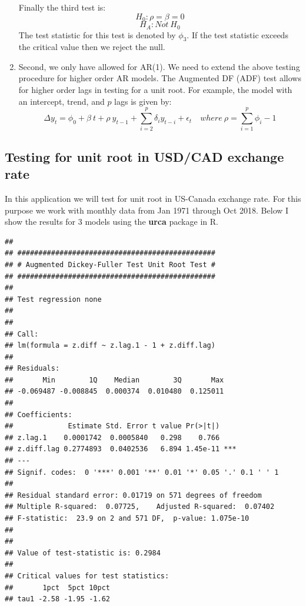 \documentclass[]{book}
\theoremstyle{definition}
\theoremstyle{definition}
\theoremstyle{definition}
\theoremstyle{remark}
\begin{document}
\begin{enumerate}
  Finally the third test is: \[H_0: \rho=\beta=0 \] \[H_A: Not \ H_0\]
  The test statistic for this test is denoted by \(\phi_3\). If the test
  statistic exceeds the critical value then we reject the null.
\item
  Second, we only have allowed for AR(1). We need to extend the above
  testing procedure for higher order AR models. The Augmented DF (ADF)
  test allows for higher order lags in testing for a unit root. For
  example, the model with an intercept, trend, and \(p\) lags is given
  by:
  \[\Delta y_t= \phi_0 + \beta \ t+ \rho \ y_{t-1}+\sum_{i=2}^p\delta_i  y_{t-i}+\epsilon_t  \quad where \ \rho=\sum_{i=1}^p \phi_i-1\]
\end{enumerate}

\hypertarget{testing-for-unit-root-in-usdcad-exchange-rate}{%
\subsection{Testing for unit root in USD/CAD exchange
rate}\label{testing-for-unit-root-in-usdcad-exchange-rate}}

In this application we will test for unit root in US-Canada exchange
rate. For this purpose we work with monthly data from Jan 1971 through
Oct 2018. Below I show the results for 3 models using the \textbf{urca}
package in R.

\begin{verbatim}
## 
## ############################################### 
## # Augmented Dickey-Fuller Test Unit Root Test # 
## ############################################### 
## 
## Test regression none 
## 
## 
## Call:
## lm(formula = z.diff ~ z.lag.1 - 1 + z.diff.lag)
## 
## Residuals:
##       Min        1Q    Median        3Q       Max 
## -0.069487 -0.008845  0.000374  0.010480  0.125011 
## 
## Coefficients:
##             Estimate Std. Error t value Pr(>|t|)    
## z.lag.1    0.0001742  0.0005840   0.298    0.766    
## z.diff.lag 0.2774893  0.0402536   6.894 1.45e-11 ***
## ---
## Signif. codes:  0 '***' 0.001 '**' 0.01 '*' 0.05 '.' 0.1 ' ' 1
## 
## Residual standard error: 0.01719 on 571 degrees of freedom
## Multiple R-squared:  0.07725,    Adjusted R-squared:  0.07402 
## F-statistic:  23.9 on 2 and 571 DF,  p-value: 1.075e-10
## 
## 
## Value of test-statistic is: 0.2984 
## 
## Critical values for test statistics: 
##       1pct  5pct 10pct
## tau1 -2.58 -1.95 -1.62
\end{verbatim}
\end{document}
